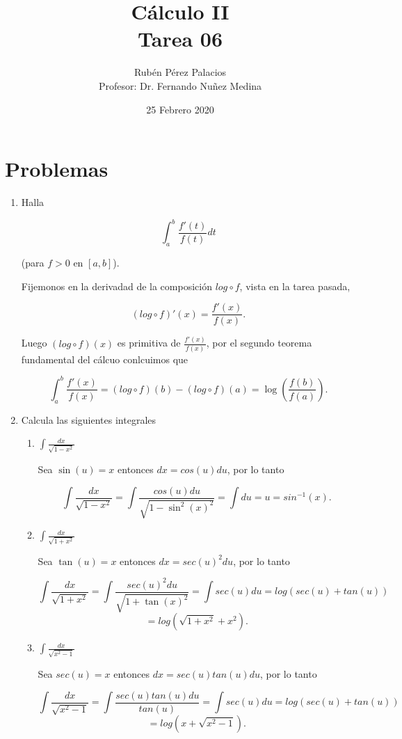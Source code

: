 \documentclass[letterpaper]{article}
\title{Cálculo II\\Tarea 06}
\author{Rubén Pérez Palacios\\Profesor: Dr. Fernando Nuñez Medina}
\date{25 Febrero 2020}
\theoremstyle{definition}
\theoremstyle{definition}
\begin{document}
\maketitle

\section*{Problemas}

\begin{enumerate}
    
  \item Halla
  
  \[\int_{a}^{b} \frac{f'(t)}{f(t)}dt\]

  (para $f > 0$ en $[a,b]$).

  Fijemonos en la derivadad de la composición $log \circ f$, vista en la tarea pasada,

  \[(log \circ f)'(x) = \frac{f'(x)}{f(x)}.\]

  Luego $(log \circ f)(x)$ es primitiva de $\frac{f'(x)}{f(x)}$, por el segundo teorema fundamental del cálcuo conlcuimos que

  \[\int_{a}^{b} \frac{f'(x)}{f(x)} = (log \circ f)(b) - (log \circ f)(a) = \log\left(\frac{f(b)}{f(a)}\right).\]

  \item Calcula las siguientes integrales

  \begin{enumerate}
    \item $\int \frac{dx}{\sqrt{1-x^2}}$
    
    Sea $\sin(u) = x$ entonces $dx = cos(u) du$, por lo tanto

    \[\int \frac{dx}{\sqrt{1-x^2}} = \int \frac{cos(u)du}{\sqrt{1-\sin^2(x)^2}} = \int du = u = sin^{-1}(x).\]

    \item $\int \frac{dx}{\sqrt{1+x^2}}$
    
    Sea $\tan(u) = x$ entonces $dx = sec(u)^2 du$, por lo tanto

    \[\int \frac{dx}{\sqrt{1+x^2}} = \int \frac{sec(u)^2du}{\sqrt{1+\tan(x)^2}} =\int sec(u)du = log(sec(u) + tan(u))\]\[ = log(\sqrt{1+x^2} + x^2).\]

    \item $\int \frac{dx}{\sqrt{x^2-1}}$
    
    Sea $sec(u) = x$ entonces $dx = sec(u)tan(u)du$, por lo tanto

    \[\int \frac{dx}{\sqrt{x^2-1}} = \int \frac{sec(u)tan(u)du}{tan(u)} = \int sec(u)du = log(sec(u) + tan(u))\]\[ = log(x + \sqrt{x^2-1}).\]


\end{enumerate}
\end{enumerate}
\end{document}
